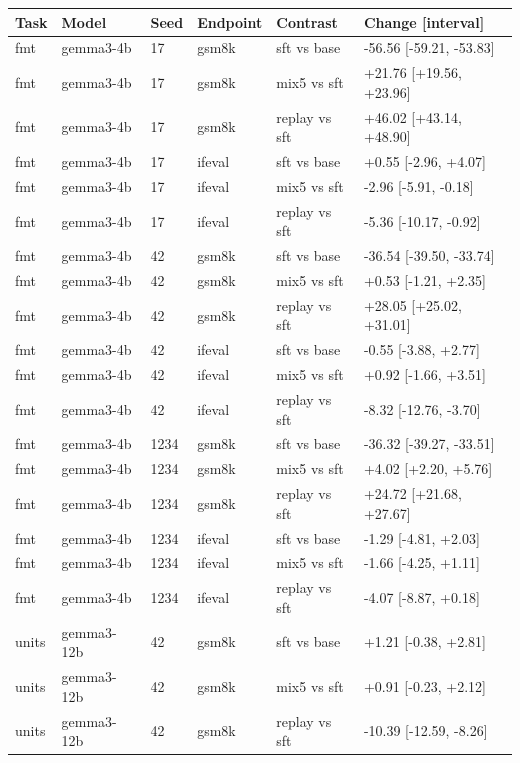 \begin{table}[t]
\centering\small
\begin{tabular}{llllll}
\toprule
Task & Model & Seed & Endpoint & Contrast & Change [interval] \\
\midrule
fmt & gemma3-4b & 17 & gsm8k & sft vs base & -56.56 [-59.21, -53.83] \\
fmt & gemma3-4b & 17 & gsm8k & mix5 vs sft & +21.76 [+19.56, +23.96] \\
fmt & gemma3-4b & 17 & gsm8k & replay vs sft & +46.02 [+43.14, +48.90] \\
fmt & gemma3-4b & 17 & ifeval & sft vs base & +0.55 [-2.96, +4.07] \\
fmt & gemma3-4b & 17 & ifeval & mix5 vs sft & -2.96 [-5.91, -0.18] \\
fmt & gemma3-4b & 17 & ifeval & replay vs sft & -5.36 [-10.17, -0.92] \\
fmt & gemma3-4b & 42 & gsm8k & sft vs base & -36.54 [-39.50, -33.74] \\
fmt & gemma3-4b & 42 & gsm8k & mix5 vs sft & +0.53 [-1.21, +2.35] \\
fmt & gemma3-4b & 42 & gsm8k & replay vs sft & +28.05 [+25.02, +31.01] \\
fmt & gemma3-4b & 42 & ifeval & sft vs base & -0.55 [-3.88, +2.77] \\
fmt & gemma3-4b & 42 & ifeval & mix5 vs sft & +0.92 [-1.66, +3.51] \\
fmt & gemma3-4b & 42 & ifeval & replay vs sft & -8.32 [-12.76, -3.70] \\
fmt & gemma3-4b & 1234 & gsm8k & sft vs base & -36.32 [-39.27, -33.51] \\
fmt & gemma3-4b & 1234 & gsm8k & mix5 vs sft & +4.02 [+2.20, +5.76] \\
fmt & gemma3-4b & 1234 & gsm8k & replay vs sft & +24.72 [+21.68, +27.67] \\
fmt & gemma3-4b & 1234 & ifeval & sft vs base & -1.29 [-4.81, +2.03] \\
fmt & gemma3-4b & 1234 & ifeval & mix5 vs sft & -1.66 [-4.25, +1.11] \\
fmt & gemma3-4b & 1234 & ifeval & replay vs sft & -4.07 [-8.87, +0.18] \\
units & gemma3-12b & 42 & gsm8k & sft vs base & +1.21 [-0.38, +2.81] \\
units & gemma3-12b & 42 & gsm8k & mix5 vs sft & +0.91 [-0.23, +2.12] \\
units & gemma3-12b & 42 & gsm8k & replay vs sft & -10.39 [-12.59, -8.26] \\

\end{tabular}
\end{table}
